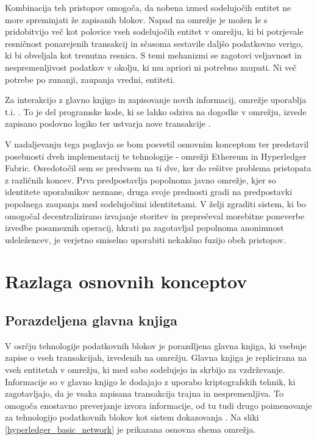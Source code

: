 \documentclass[a4paper, 12pt]{book}
\begin{document}
Kombinacija teh pristopov omogoča, da nobena izmed sodelujočih entitet ne more spreminjati že zapisanih blokov.
Napad na omrežje je možen le s pridobitvijo več kot polovice vseh sodelujočih entitet v omrežju, ki bi potrjevale resničnost ponarejenih transakcij in sčasoma sestavile daljšo podatkovno verigo, ki bi obveljala kot trenutna resnica.
S temi mehanizmi se zagotovi veljavnost in nespremenljivost podatkov v okolju, ki mu apriori ni potrebno zaupati.
Ni več potrebe po zunanji, zaupanja vredni, entiteti.

Za interakcijo z glavno knjigo in zapisovanje novih informacij, omrežje uporablja t.i. .
To je del programske kode, ki se lahko odziva na dogodke v omrežju, izvede zapisano poslovno logiko ter ustvarja nove transakcije \cite{hyperledgerDocs}.

V nadaljevanju tega poglavja se bom posvetil osnovnim konceptom ter predstavil posebnosti dveh implementacij te tehnologije - omrežji Ethereum in Hyperledger Fabric.
Osredotočil sem se predvsem na ti dve, ker do rešitve problema pristopata z različnih koncev.
Prva predpostavlja popolnoma javno omrežje, kjer so identitete uporabnikov neznane, druga svoje prednosti gradi na predpostavki popolnega zaupanja med sodelujočimi identitetami.
V želji zgraditi sistem, ki bo omogočal decentralizirano izvajanje storitev in preprečeval morebitne poneverbe izvedbe posameznih operacij, hkrati pa zagotavljal popolnoma anonimnost udeležencev, je verjetno smiselno uporabiti nekakšno fuzijo obeh pristopov.

\section{Razlaga osnovnih konceptov}

\subsection{Porazdeljena glavna knjiga}
V osrčju tehnologije podatkovnih blokov je porazdljena glavna knjiga, ki vsebuje zapise o vseh transakcijah, izvedenih na omrežju.
Glavna knjiga je replicirana na vseh entitetah v omrežju, ki med sabo sodelujejo in skrbijo za vzdrževanje.
Informacije so v glavno knjigo le dodajajo z uporabo kriptografskih tehnik, ki zagotavljajo, da je vsaka zapisana transakcija trajna in nespremenljiva.
To omogoča enostavno preverjanje izvora informacije, od tu tudi drugo poimenovanje za tehnologijo podatkovnih blokov kot sistem dokazovanja \cite{hyperledgerDocs}.
Na sliki \ref{hyperledger_basic_network} je prikazana osnovna shema omrežja.
\end{document}
